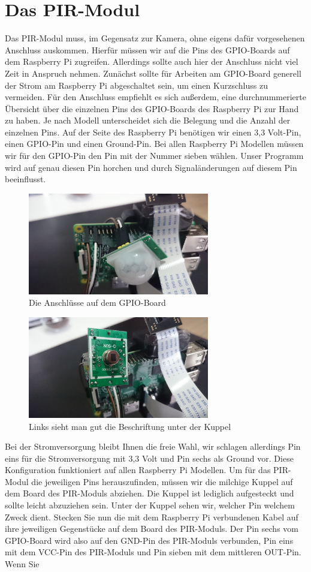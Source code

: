 \documentclass[12pt,a4paper]{scrreprt}
\begin{document}
\section{Das PIR-Modul} 
Das PIR-Modul muss, im Gegensatz zur Kamera, ohne eigens dafür vorgesehenen Anschluss auskommen. Hierfür müssen wir auf die Pins des GPIO-Boards auf dem Raspberry Pi zugreifen. Allerdings sollte auch hier der Anschluss nicht viel Zeit in Anspruch nehmen. Zunächst sollte für Arbeiten am GPIO-Board generell der Strom am Raspberry Pi abgeschaltet sein, um einen Kurzschluss zu vermeiden. Für den Anschluss empfiehlt es sich außerdem, eine durchnummerierte Übersicht über die einzelnen Pins des GPIO-Boards des Raspberry Pi zur Hand zu haben. Je nach Modell unterscheidet sich die Belegung und die Anzahl der einzelnen Pins. Auf der Seite des Raspberry Pi benötigen wir einen 3,3 Volt-Pin, einen GPIO-Pin und einen Ground-Pin. Bei allen Raspberry Pi Modellen müssen wir für den GPIO-Pin den Pin mit der Nummer sieben wählen. Unser Programm wird auf genau diesen Pin horchen und durch Signaländerungen auf diesem Pin beeinflusst. \begin{figure}[h] \centering \includegraphics[width = 7.9cm]{pir1.JPG} \caption{Die Anschlüsse auf dem GPIO-Board} \end{figure} \begin{figure}[h] \centering \includegraphics[width = 7.9cm]{pir2.JPG} \caption{Links sieht man gut die Beschriftung unter der Kuppel} \end{figure} Bei der Stromversorgung bleibt Ihnen die freie Wahl, wir schlagen allerdings Pin eins für die Stromversorgung mit 3,3 Volt und Pin sechs als Ground vor. Diese Konfiguration funktioniert auf allen Raspberry Pi Modellen. Um für das PIR-Modul die jeweiligen Pins herauszufinden, müssen wir die milchige Kuppel auf dem Board des PIR-Moduls abziehen. Die Kuppel ist lediglich aufgesteckt und sollte leicht abzuziehen sein. Unter der Kuppel sehen wir, welcher Pin welchem Zweck dient. Stecken Sie nun die mit dem Raspberry Pi verbundenen Kabel auf ihre jeweiligen Gegenstücke auf dem Board des PIR-Moduls. Der Pin sechs vom GPIO-Board wird also auf den GND-Pin des PIR-Moduls verbunden, Pin eins mit dem VCC-Pin des PIR-Moduls und Pin sieben mit dem mittleren OUT-Pin. Wenn Sie 
\end{document}
